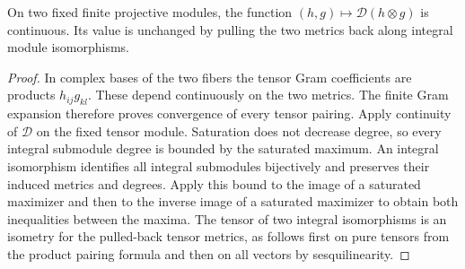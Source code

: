 \begin{lemma}
\label{lem:tensor-maximum-continuity}
\leanok
{}
On two fixed finite projective modules, the function
$(h,g)\mapsto\mathcal D(h\otimes g)$ is continuous. Its value is
unchanged by pulling the two metrics back along integral module isomorphisms.
\end{lemma}
\begin{proof}
In complex bases of the two fibers the tensor Gram coefficients are
products $h_{ij}g_{kl}$. These depend continuously on the two metrics.
The finite Gram expansion therefore proves convergence of every tensor
pairing. Apply continuity of $\mathcal D$ on the fixed tensor module.
Saturation does not decrease degree, so every integral submodule degree
is bounded by the saturated maximum. An integral isomorphism identifies
all integral submodules bijectively and preserves their induced metrics
and degrees. Apply this bound to the image of a saturated maximizer and
then to the inverse image of a saturated maximizer to obtain both
inequalities between the maxima. The tensor of two integral isomorphisms is an isometry for the
pulled-back tensor metrics, as follows first on pure tensors from the
product pairing formula and then on all vectors by sesquilinearity.
\end{proof}

